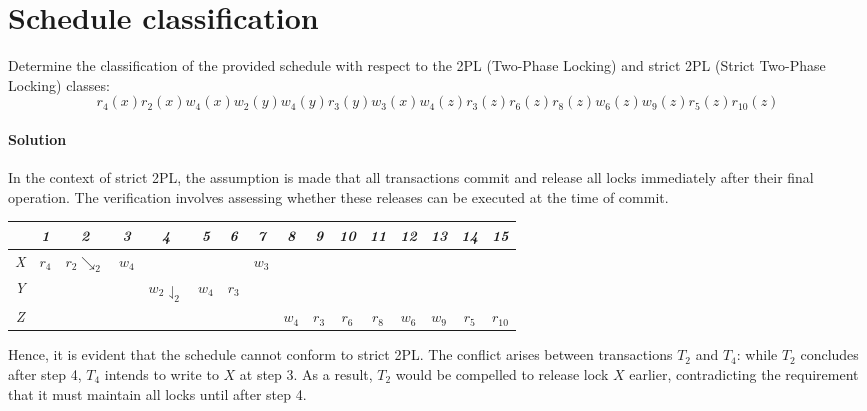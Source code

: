 \section{Schedule classification}

Determine the classification of the provided schedule with respect to the 2PL (Two-Phase Locking) and strict 2PL (Strict Two-Phase Locking) classes:
\[r_4(x) r_2(x) w_4(x) w_2(y) w_4(y) r_3(y) w_3(x) w_4(z) r_3(z) r_6(z) r_8(z) w_6(z) w_9(z) r_5(z) r_10(z)\]

\paragraph*{Solution}
In the context of strict 2PL, the assumption is made that all transactions commit and release all locks immediately after their final operation. 
The verification involves assessing whether these releases can be executed at the time of commit.
\begin{table}[H]
    \centering
    \begin{tabular}{c|ccccccccccccccc}
                & \textit{1} & \textit{2} & \textit{3} & \textit{4} & \textit{5} & \textit{6} & \textit{7} & \textit{8} & \textit{9} & \textit{10} & \textit{11} & \textit{12} & \textit{13} & \textit{14} & \textit{15} \\ \hline
    \textit{X} & $r_4$      & $r_2\searrow _2$          & $w_4$      &                              &            &            & $w_3$      &            &            &             &             &             &             &             &             \\
    \textit{Y} &            &                           &            & $w_2\downharpoonleft_2$      & $w_4$      & $r_3$      &            &            &            &             &             &             &             &             &             \\
    \textit{Z} &            &                           &            &                              &            &            &            & $w_4$      & $r_3$      & $r_6$       & $r_8$       & $w_6$       & $w_9$       & $r_5$       & $r_{10}$     
    \end{tabular}%
\end{table}
Hence, it is evident that the schedule cannot conform to strict 2PL. 
The conflict arises between transactions $T_2$ and $T_4$: while $T_2$ concludes after step 4, $T_4$ intends to write to $X$ at step 3.
As a result, $T_2$ would be compelled to release lock $X$ earlier, contradicting the requirement that it must maintain all locks until after step 4.

